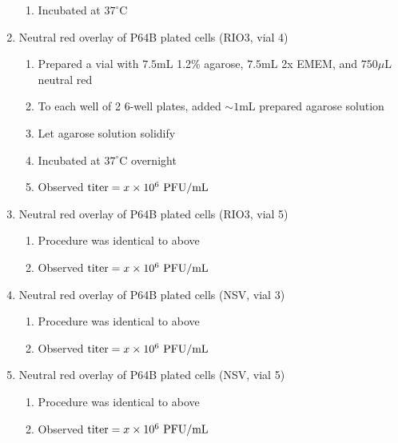 \begin{enumerate}
\begin{enumerate}
			\item Incubated at $37^{\circ}$C
		\end{enumerate}
	\item Neutral red overlay of P64B plated cells (RIO3, vial 4)
		\begin{enumerate}
			\item Prepared a vial with $7.5$mL 1.2\% agarose, $7.5$mL 2x EMEM, and $750\mu$L neutral red
			\item To each well of 2 6-well plates, added $\sim 1$mL prepared agarose solution
			\item Let agarose solution solidify
			\item Incubated at $37^{\circ}$C overnight
			\item Observed $\text{titer}=x\times 10^{6}\text{ PFU/mL}$
		\end{enumerate}
	\item Neutral red overlay of P64B plated cells (RIO3, vial 5)
		\begin{enumerate}
			\item Procedure was identical to above
			\item Observed $\text{titer}=x\times 10^{6}\text{ PFU/mL}$
		\end{enumerate}
	\item Neutral red overlay of P64B plated cells (NSV, vial 3)
		\begin{enumerate}
			\item Procedure was identical to above
			\item Observed $\text{titer}=x\times 10^{6}\text{ PFU/mL}$
		\end{enumerate}
	\item Neutral red overlay of P64B plated cells (NSV, vial 5)
		\begin{enumerate}
			\item Procedure was identical to above
			\item Observed $\text{titer}=x\times 10^{6}\text{ PFU/mL}$
		\end{enumerate}
\end{enumerate}


